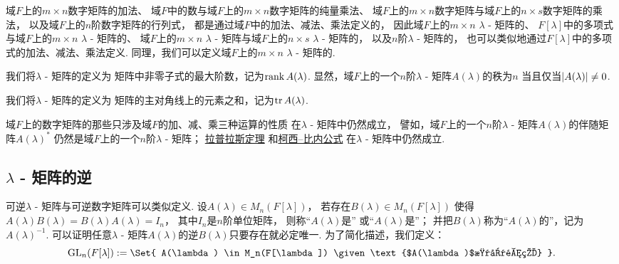域\(F\)上的\(m \times n\)数字矩阵的加法、
域\(F\)中的数与域\(F\)上的\(m \times n\)数字矩阵的纯量乘法、
域\(F\)上的\(m \times n\)数字矩阵与域\(F\)上的\(n \times s\)数字矩阵的乘法，
以及域\(F\)上的\(n\)阶数字矩阵的行列式，
都是通过域\(F\)中的加法、减法、乘法定义的，
因此域\(F\)上的\(m \times n\) \(\lambda\) - 矩阵的、
\(F[\lambda]\)中的多项式与域\(F\)上的\(m \times n\) \(\lambda\) - 矩阵的、
域\(F\)上的\(m \times n\) \(\lambda\) - 矩阵与域\(F\)上的\(n \times s\) \(\lambda\) - 矩阵的，
以及\(n\)阶\(\lambda\) - 矩阵的，
也可以类似地通过\(F[\lambda]\)中的多项式的加法、减法、乘法定义.
同理，我们可以定义域\(F\)上的\(m \times n\) \(\lambda\) - 矩阵的.

我们将\(\lambda\) - 矩阵的定义为
矩阵中非零子式的最大阶数，记为\(\rank A(\lambda)\).
显然，域\(F\)上的一个\(n\)阶\(\lambda\) - 矩阵\(A(\lambda)\)的秩为\(n\)
当且仅当\(\abs{A(\lambda)} \neq 0\).

我们将\(\lambda\) - 矩阵的定义为
矩阵的主对角线上的元素之和，记为\(\tr A(\lambda)\).

域\(F\)上的数字矩阵的那些只涉及域\(F\)的加、减、乘三种运算的性质
在\(\lambda\) - 矩阵中仍然成立，
譬如，域\(F\)上的一个\(n\)阶\(\lambda\) - 矩阵\(A(\lambda)\)的伴随矩阵\(A(\lambda)^*\)
仍然是域\(F\)上的一个\(n\)阶\(\lambda\) - 矩阵；%
\hyperref[theorem:行列式.拉普拉斯定理]{拉普拉斯定理}%
和\hyperref[equation:线性方程组.柯西比内公式]{柯西--比内公式}%
在\(\lambda\) - 矩阵中仍然成立.

\subsection{\texorpdfstring{$\lambda$}{\textlambda} - 矩阵的逆}
可逆\(\lambda\) - 矩阵与可逆数字矩阵可以类似定义.
设\(A(\lambda) \in M_n(F[\lambda])\)，
若存在\(B(\lambda) \in M_n(F[\lambda])\)
使得\(
	A(\lambda) B(\lambda)
	= B(\lambda) A(\lambda)
	= I_n
\)，
其中\(I_n\)是\(n\)阶单位矩阵，
则称“\(A(\lambda)\)是”
或“\(A(\lambda)\)是”；
并把\(B(\lambda)\)称为“\(A(\lambda)\)的”，记为\(A(\lambda)^{-1}\).
可以证明任意\(\lambda\) - 矩阵\(A(\lambda)\)的逆\(B(\lambda)\)只要存在就必定唯一.
为了简化描述，我们定义：\begin{equation*}
	\GeneralLinearGroup_n(F[\lambda])
	\defeq
	\Set{
		A(\lambda)
		\in M_n(F[\lambda])
		\given
		\text{$A(\lambda)$是可逆的}
	}.
\end{equation*}

